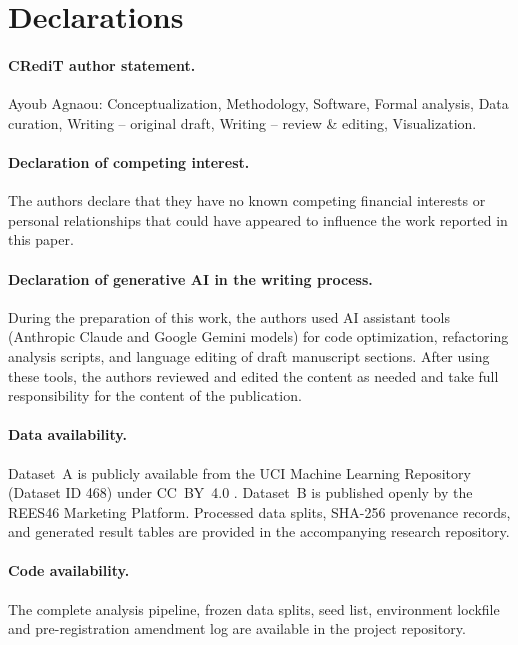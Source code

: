 \documentclass[review,3p,times,authoryear]{elsarticle}   %
\begin{document}
\section*{Declarations}

\paragraph{CRediT author statement.} Ayoub Agnaou: Conceptualization, Methodology,
Software, Formal analysis, Data curation, Writing -- original draft, Writing --
review \& editing, Visualization.

\paragraph{Declaration of competing interest.} The authors declare that they have no known competing financial interests or personal relationships that could have appeared to influence the work reported in this paper.

\paragraph{Declaration of generative AI in the writing process.} During the preparation of this work, the authors used AI assistant tools (Anthropic Claude and Google Gemini models) for code optimization, refactoring analysis scripts, and language editing of draft manuscript sections. After using these tools, the authors reviewed and edited the content as needed and take full responsibility for the content of the publication.

\paragraph{Data availability.} Dataset~A is publicly available from the UCI Machine Learning Repository (Dataset ID 468) under CC~BY~4.0 \citep{sakar2019real}. Dataset~B is published openly by the REES46 Marketing Platform. Processed data splits, SHA-256 provenance records, and generated result tables are provided in the accompanying research repository.

\paragraph{Code availability.} The complete analysis pipeline, frozen data splits, seed list, environment lockfile and pre-registration amendment log are available in the project repository.
\end{document}
